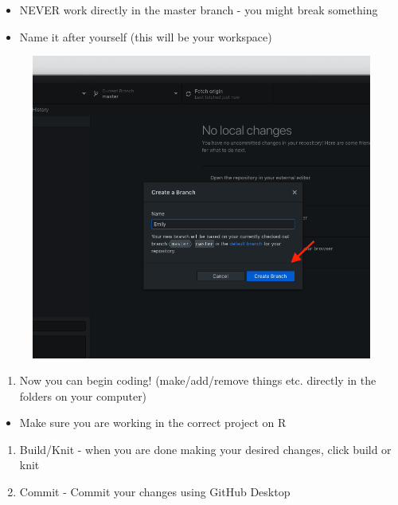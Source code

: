 \documentclass[]{book}
\providecommand{\tightlist}{%
  \setlength{\itemsep}{0pt}\setlength{\parskip}{0pt}}
\begin{document}
\begin{itemize}
\tightlist
\item
  NEVER work directly in the master branch - you might break something
\item
  Name it after yourself (this will be your workspace)
\end{itemize}

\begin{figure}
\centering
\includegraphics{images/research_protocols/github/29.png}
\caption{}
\end{figure}

\begin{enumerate}
\def\labelenumi{\arabic{enumi}.}
\setcounter{enumi}{2}
\tightlist
\item
  Now you can begin coding! (make/add/remove things etc. directly in the
  folders on your computer)
\end{enumerate}

\begin{itemize}
\tightlist
\item
  Make sure you are working in the correct project on R
\end{itemize}

\begin{enumerate}
\def\labelenumi{\arabic{enumi}.}
\setcounter{enumi}{3}
\item
  Build/Knit - when you are done making your desired changes, click
  build or knit
\item
  Commit - Commit your changes using GitHub Desktop
\end{enumerate}
\end{document}

